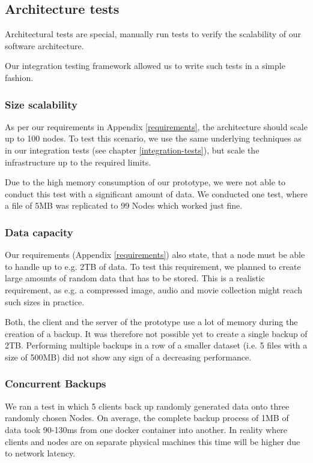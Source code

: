 \subsection{Architecture tests}

Architectural tests are special, manually run tests to verify the scalability of our software architecture.

Our integration testing framework allowed us to write such tests in a simple fashion.

\subsubsection{Size scalability}
As per our requirements in Appendix \ref{requirements}, the architecture should scale up to 100 nodes. To test this scenario, we use the same underlying techniques as in our integration tests (see chapter \ref{integration-tests}), but scale the infrastructure up to the required limits.

Due to the high memory consumption of our prototype, we were not able to conduct this test with a significant amount of data. We conducted one test, where a file of 5MB was replicated to 99 Nodes which worked just fine.

\subsubsection{Data capacity}
Our requirements (Appendix \ref{requirements}) also state, that a node must be able to handle up to e.g. 2TB of data. To test this requirement, we planned to create large amounts of random data that has to be stored. This is a realistic requirement, as e.g. a compressed image, audio and movie collection might reach such sizes in practice.

Both, the client and the server of the prototype use a lot of memory during the creation of a backup. It was therefore not possible yet to create a single backup of 2TB. Performing multiple backups in a row of a smaller dataset (i.e. 5 files with a size of 500MB) did not show any sign of a decreasing performance.

\subsubsection{Concurrent Backups}

We ran a test in which 5 clients back up randomly generated data onto three randomly chosen Nodes. On average, the complete backup process of 1MB of data took 90-130ms from one docker container into another. In reality where clients and nodes are on separate physical machines this time will be higher due to network latency.

